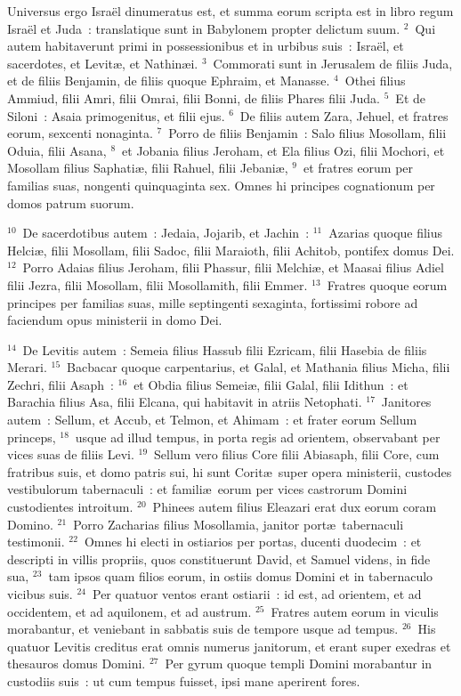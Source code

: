\lettrine[lines=3,image=true,loversize=0.05,lraise=-0.03]{U}{}niversus ergo Isra\"el dinumeratus est, et summa eorum scripta est in libro regum Isra\"el et Juda~: translatique sunt in Babylonem propter delictum suum.
${}^{2}$~Qui autem habitaverunt primi in possessionibus et in urbibus suis~: Isra\"el, et sacerdotes, et Levit\ae , et Nathin\ae i.
${}^{3}$~Commorati sunt in Jerusalem de filiis Juda, et de filiis Benjamin, de filiis quoque Ephraim, et Manasse.
${}^{4}$~Othei filius Ammiud, filii Amri, filii Omrai, filii Bonni, de filiis Phares filii Juda.
${}^{5}$~Et de Siloni~: Asaia primogenitus, et filii ejus.
${}^{6}$~De filiis autem Zara, Jehuel, et fratres eorum, sexcenti nonaginta.
${}^{7}$~Porro de filiis Benjamin~: Salo filius Mosollam, filii Oduia, filii Asana,
${}^{8}$~et Jobania filius Jeroham, et Ela filius Ozi, filii Mochori, et Mosollam filius Saphati\ae , filii Rahuel, filii Jebani\ae ,
${}^{9}$~et fratres eorum per familias suas, nongenti quinquaginta sex. Omnes hi principes cognationum per domos patrum suorum.


${}^{10}$~De sacerdotibus autem~: Jedaia, Jojarib, et Jachin~:
${}^{11}$~Azarias quoque filius Helci\ae , filii Mosollam, filii Sadoc, filii Maraioth, filii Achitob, pontifex domus Dei.
${}^{12}$~Porro Adaias filius Jeroham, filii Phassur, filii Melchi\ae , et Maasai filius Adiel filii Jezra, filii Mosollam, filii Mosollamith, filii Emmer.
${}^{13}$~Fratres quoque eorum principes per familias suas, mille septingenti sexaginta, fortissimi robore ad faciendum opus ministerii in domo Dei.


${}^{14}$~De Levitis autem~: Semeia filius Hassub filii Ezricam, filii Hasebia de filiis Merari.
${}^{15}$~Bacbacar quoque carpentarius, et Galal, et Mathania filius Micha, filii Zechri, filii Asaph~:
${}^{16}$~et Obdia filius Semei\ae , filii Galal, filii Idithun~: et Barachia filius Asa, filii Elcana, qui habitavit in atriis Netophati.
${}^{17}$~Janitores autem~: Sellum, et Accub, et Telmon, et Ahimam~: et frater eorum Sellum princeps,
${}^{18}$~usque ad illud tempus, in porta regis ad orientem, observabant per vices suas de filiis Levi.
${}^{19}$~Sellum vero filius Core filii Abiasaph, filii Core, cum fratribus suis, et domo patris sui, hi sunt Corit\ae\ super opera ministerii, custodes vestibulorum tabernaculi~: et famili\ae\ eorum per vices castrorum Domini custodientes introitum.
${}^{20}$~Phinees autem filius Eleazari erat dux eorum coram Domino.
${}^{21}$~Porro Zacharias filius Mosollamia, janitor port\ae\ tabernaculi testimonii.
${}^{22}$~Omnes hi electi in ostiarios per portas, ducenti duodecim~: et descripti in villis propriis, quos constituerunt David, et Samuel videns, in fide sua,
${}^{23}$~tam ipsos quam filios eorum, in ostiis domus Domini et in tabernaculo vicibus suis.
${}^{24}$~Per quatuor ventos erant ostiarii~: id est, ad orientem, et ad occidentem, et ad aquilonem, et ad austrum.
${}^{25}$~Fratres autem eorum in viculis morabantur, et veniebant in sabbatis suis de tempore usque ad tempus.
${}^{26}$~His quatuor Levitis creditus erat omnis numerus janitorum, et erant super exedras et thesauros domus Domini.
${}^{27}$~Per gyrum quoque templi Domini morabantur in custodiis suis~: ut cum tempus fuisset, ipsi mane aperirent fores.


